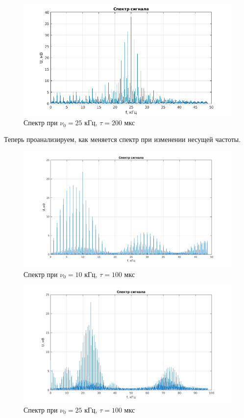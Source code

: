 \begin{figure}[h!]
    \centering
    \includegraphics[width = 14 cm]{images/2_200_1.png}
    \caption{Спектр при $\nu_0 = 25$ кГц, $\tau = 200$ мкс}
\end{figure}

Теперь проанализируем, как меняется спектр при изменении несущей частоты.

\begin{figure}[h!]
    \centering
    \includegraphics[width = 14 cm]{images/2_10k.png}
    \caption{Спектр при $\nu_0 = 10$ кГц, $\tau = 100$ мкс}
\end{figure}

\begin{figure}[h!]
    \centering
    \includegraphics[width = 14 cm]{images/2_25k.png}
    \caption{Спектр при $\nu_0 = 25$ кГц, $\tau = 100$ мкс}
\end{figure}

